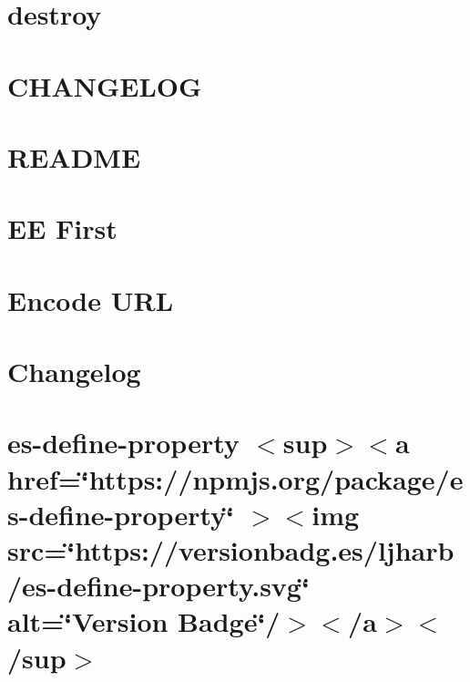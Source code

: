 \documentclass[twoside]{book}
\newcommand{\+}{\discretionary{\mbox{\scriptsize$\hookleftarrow$}}{}{}}
\begin{document}
\chapter{destroy}
\label{md_src_nodejs_node_modules_destroy_README}

\chapter{CHANGELOG}
\label{md_src_nodejs_node_modules_doctrine_CHANGELOG}

\chapter{README}
\label{md_src_nodejs_node_modules_doctrine_README}

\chapter{EE First}
\label{md_src_nodejs_node_modules_ee_first_README}

\chapter{Encode URL}
\label{md_src_nodejs_node_modules_encodeurl_README}

\chapter{Changelog}
\label{md_src_nodejs_node_modules_es_define_property_CHANGELOG}

\chapter{es-\/define-\/property \texorpdfstring{$<$}{<}sup\texorpdfstring{$>$}{>}\texorpdfstring{$<$}{<}a href=\char`\"{}https\+://npmjs.\+org/package/es-\/define-\/property\char`\"{} \texorpdfstring{$>$}{>}\texorpdfstring{$<$}{<}img src=\char`\"{}https\+://versionbadg.\+es/ljharb/es-\/define-\/property.\+svg\char`\"{} alt=\char`\"{}\+Version Badge\char`\"{}/\texorpdfstring{$>$}{>}\texorpdfstring{$<$}{<}/a\texorpdfstring{$>$}{>}\texorpdfstring{$<$}{<}/sup\texorpdfstring{$>$}{>}}
\label{md_src_nodejs_node_modules_es_define_property_README}

\end{document}

